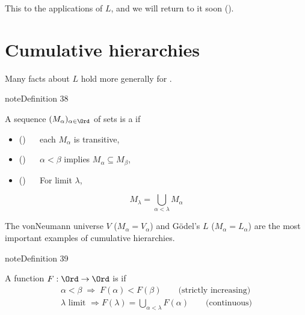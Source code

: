 \documentclass[letterpaper,10pt,english]{jupyterBook}
\begin{document}
\sphinxAtStartPar
This  to the applications of \(L\), and we will return to it soon ({\hyperref[\detokenize{V=L:prop-map-Lalpha}]{}}).


\section{Cumulative hierarchies}
\label{\detokenize{constructible:cumulative-hierarchies}}
\sphinxAtStartPar
Many facts about \(L\) hold more generally for .
\label{constructible:def-cumulative}
\begin{sphinxadmonition}{note}{Definition 38}



\sphinxAtStartPar
A sequence \((M_\alpha)_{\alpha \in \Ord}\) of sets is a  if
\begin{itemize}
\item {} 
\sphinxAtStartPar
() \(\quad\) each \(M_\alpha\) is transitive,

\item {} 
\sphinxAtStartPar
() \(\quad\) \(\alpha < \beta\) implies \(M_\alpha \subseteq M_\beta\),

\item {} 
\sphinxAtStartPar
() \(\quad\) For limit \(\lambda\),

\end{itemize}
\begin{equation*}
	M_\lambda = \bigcup_{\alpha < \lambda} M_\alpha
\end{equation*}\end{sphinxadmonition}

\sphinxAtStartPar
The von\sphinxhyphen{}Neumann universe \(V\) (\(M_\alpha = V_\alpha\)) and Gödel’s \(L\) (\(M_\alpha = L_\alpha\)) are the most important examples of cumulative hierarchies.
\label{constructible:def-normal-function}
\begin{sphinxadmonition}{note}{Definition 39}



\sphinxAtStartPar
A function \(F: \Ord \to \Ord\) is  if
\begin{gather*}
\alpha < \beta \; \Rightarrow \; F(\alpha) < F(\beta) \qquad \text{(strictly increasing)} \\
\lambda \text{ limit } \Rightarrow F(\lambda) = \bigcup_{\alpha < \lambda} F(\alpha) \qquad \text{(continuous)}
\end{gather*}\end{sphinxadmonition}
\end{document}
